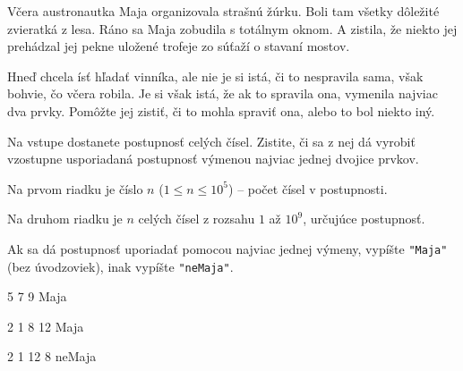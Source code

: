 




Včera austronautka Maja organizovala strašnú žúrku. Boli tam všetky dôležité zvieratká z lesa. Ráno
sa Maja zobudila s totálnym oknom. A zistila, že niekto jej prehádzal jej pekne uložené trofeje zo
súťaží o stavaní mostov.

Hneď chcela ísť hľadať vinníka, ale nie je si istá, či to nespravila sama, však bohvie, čo včera
robila. Je si však istá, že ak to spravila ona, vymenila najviac dva prvky. Pomôžte jej zistiť, či to
mohla spraviť ona, alebo to bol niekto iný.


Na vstupe dostanete postupnosť celých čísel. Zistite, či sa z nej dá vyrobiť vzostupne 
usporiadaná postupnosť výmenou najviac jednej dvojice prvkov. 


Na prvom riadku je číslo $n$ ($1 \leq n \leq 10^5$) -- počet čísel v postupnosti.

Na druhom riadku je $n$ celých čísel z rozsahu $1$ až $10^9$, určujúce postupnosť.


Ak sa dá postupnosť uporiadať pomocou najviac jednej výmeny, vypíšte \texttt{"Maja"} (bez
úvodzoviek), inak vypíšte \texttt{"neMaja"}.


5 7 9
\vystup
Maja
\koniec

2 1 8 12
\vystup
Maja
\koniec

2 1 12 8
\vystup
neMaja
\koniec



